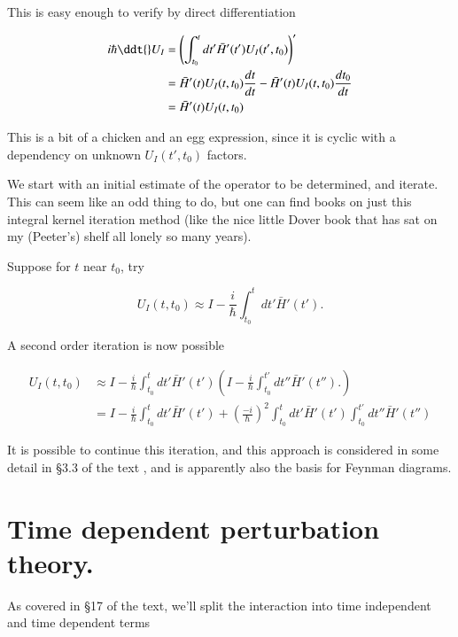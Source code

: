 This is easy enough to verify by direct differentiation

\begin{align*}
i \hbar \ddt{} U_I
&=
\left(\int_{t_0}^t dt' \bar{H}'(t') U_I(t', t_0) \right)' \\
&=
\bar{H}'(t) U_I(t, t_0) \frac{dt}{dt}
-
\bar{H}'(t) U_I(t, t_0) \frac{dt_0}{dt} \\
&=
\bar{H}'(t) U_I(t, t_0)
\end{align*}

This is a bit of a chicken and an egg expression, since it is cyclic with a dependency on unknown $U_I(t', t_0)$ factors.

We start with an initial estimate of the operator to be determined, and iterate.  This can seem like an odd thing to do, but one can find books on just this integral kernel iteration method (like the nice little Dover book \cite{tricomi1985integral} that has sat on my (Peeter's) shelf all lonely so many years).

Suppose for $t$ near $t_0$, try

\begin{equation}\label{eqn:qmTwoL7:110}
U_I(t, t_0) \approx
I - \frac{i}{\hbar} \int_{t_0}^t dt' \bar{H}'(t').
\end{equation}

A second order iteration is now possible

\begin{equation}\label{eqn:qmTwoL7:130}
\begin{aligned}
U_I(t, t_0)
&\approx
I - \frac{i}{\hbar} \int_{t_0}^t dt' \bar{H}'(t') \left(
I - \frac{i}{\hbar} \int_{t_0}^{t'} dt'' \bar{H}'(t'').
\right) \\
&=
I - \frac{i}{\hbar} \int_{t_0}^t dt' \bar{H}'(t') + \left(\frac{-i}{\hbar}\right)^2
\int_{t_0}^t dt' \bar{H}'(t') \int_{t_0}^{t'} dt'' \bar{H}'(t'')
\end{aligned}
\end{equation}

It is possible to continue this iteration, and this approach is considered in some detail in \S 3.3 of the text \cite{desai2009quantum}, and is apparently also the basis for Feynman diagrams.

\section{Time dependent perturbation theory.}

As covered in \S 17 of the text, we'll split the interaction into time independent and time dependent terms

